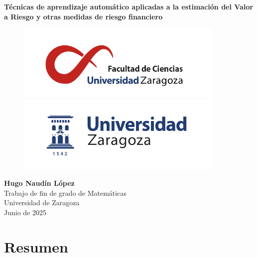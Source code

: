 \documentclass[11pt]{book}
\newcommand{\clearemptydoublepage}{\newpage{\pagestyle{empty}\cleardoublepage}}
\theoremstyle{plain} %
\theoremstyle{definition} %
\begin{document}
\frontmatter                     %
\pagestyle{primeraparte}    %


\begin{titlepage}
\begin{center}

\null
\vfill

\Huge{\bfseries Técnicas de aprendizaje automático aplicadas a la estimación del Valor a Riesgo y otras medidas de riesgo financiero}

\vfill

\noindent
\begin{figure}[h]
\centering
\includegraphics[width=100mm]{ciencias.png}\\%
\includegraphics[width=100mm]{logoUZ.png}
\end{figure}

\vfill

\Huge{\bfseries Hugo Naudín López}\\%
\Huge{Trabajo de fin de grado de Matemáticas}\\%
\Huge{Universidad de Zaragoza}\\%

\vfill
\huge{Junio de 2025}
\end{center}
\end{titlepage}

\clearemptydoublepage


\chapter{Resumen}
\end{document}

